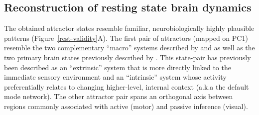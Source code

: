 \documentclass{article}
\begin{document}
\subsection{Reconstruction of resting state brain dynamics}\label{Reconstruction of resting state brain dynamics}

The obtained attractor states resemble familiar, neurobiologically highly plausible patterns (Figure~\ref{rest-validity}A). The first pair of attractors (mapped on PC1) resemble the two complementary ``macro'' systems described by \href{https://doi.org/10.1016/j.neuropsychologia.2007.10.003}{} and \href{https://doi.org/10.1371/journal.pone.0115913}{} as well as the two primary brain states previously described by \href{https://doi.org/10.1089/brain.2018.0586}{}. This state-pair has previously been described as an ``extrinsic'' system that is more directly linked to the immediate sensory environment and an ``intrinsic'' system whose activity preferentially relates to changing higher-level, internal context (a.k.a the default mode network). The other attractor pair spans an orthogonal axis between regions commonly associated with active (motor) and passive inference (visual).
\end{document}
